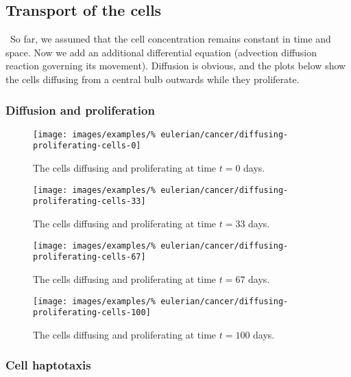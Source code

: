 \clearpage

\subsection{Transport of the cells}
\label{cell-transport}

\textbullet\ So far, we assumed that the cell concentration remains
constant in time and space. Now we add an additional differential
equation (advection diffusion reaction governing its
movement). Diffusion is obvious, and the plots below show the cells
diffusing from a central bulb outwards while they proliferate.

\subsubsection{Diffusion and proliferation}
\label{cell-diffusion-proliferation}

\begin{figure}[!hptb]
\centering
\texttt{[image: images/examples/\%
eulerian/cancer/diffusing-proliferating-cells-0]}
\caption{The cells diffusing and proliferating at time $t=0$ days.}
\label{tumour-diffusion-proliferation-0}
\end{figure}

\begin{figure}[!hptb]
\centering
\texttt{[image: images/examples/\%
eulerian/cancer/diffusing-proliferating-cells-33]}
\caption{The cells diffusing and proliferating at time $t=33$ days.}
\label{tumour-diffusion-proliferation-33}
\end{figure}

\begin{figure}[!hptb]
\centering
\texttt{[image: images/examples/\%
eulerian/cancer/diffusing-proliferating-cells-67]}
\caption{The cells diffusing and proliferating at time $t=67$ days.}
\label{tumour-diffusion-proliferation-67}
\end{figure}

\begin{figure}[!hptb]
\centering
\texttt{[image: images/examples/\%
eulerian/cancer/diffusing-proliferating-cells-100]}
\caption{The cells diffusing and proliferating at time $t=100$ days.}
\label{tumour-diffusion-proliferation-100}
\end{figure}

\subsubsection{Cell haptotaxis}
\label{eu-cell-haptotaxis}

